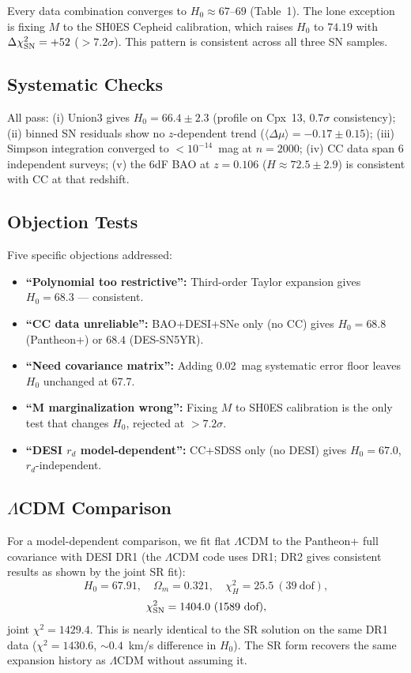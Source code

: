 \documentclass[twocolumn]{aastex631}
\begin{document}
Every data combination converges to $H_0\approx67$--$69$ (Table~1).
The lone exception is fixing $M$ to the SH0ES Cepheid calibration,
which raises $H_0$ to $74.19$ with $\Delta\chi^2_{\rm SN}=+52$
($>7.2\sigma$).  This pattern is consistent across all three SN samples.

\subsection{Systematic Checks}
All pass: (i) Union3 gives $H_0=66.4\pm2.3$ (profile on Cpx~13,
$0.7\sigma$ consistency); (ii) binned SN residuals show no
$z$-dependent trend ($\langle\Delta\mu\rangle=-0.17\pm0.15$);
(iii) Simpson integration converged to $<10^{-14}$~mag at $n=2000$;
(iv) CC data span 6 independent surveys; (v) the 6dF BAO at
$z=0.106$ ($H\approx72.5\pm2.9$) is consistent with CC at that
redshift.

\subsection{Objection Tests}
Five specific objections addressed:
\begin{itemize}
  \item \textbf{``Polynomial too restrictive'':} Third-order Taylor
        expansion gives $H_0=68.3$ --- consistent.
  \item \textbf{``CC data unreliable'':} BAO+DESI+SNe only (no CC)
        gives $H_0=68.8$ (Pantheon+) or $68.4$ (DES-SN5YR).
  \item \textbf{``Need covariance matrix'':} Adding 0.02~mag
        systematic error floor leaves $H_0$ unchanged at 67.7.
  \item \textbf{``M marginalization wrong'':} Fixing $M$ to SH0ES
        calibration is the only test that changes $H_0$, rejected at
        $>7.2\sigma$.
  \item \textbf{``DESI $r_d$ model-dependent'':} CC+SDSS only
        (no DESI) gives $H_0=67.0$, $r_d$-independent.
\end{itemize}

\subsection{$\Lambda$CDM Comparison}
For a model-dependent comparison, we fit flat $\Lambda$CDM to the
Pantheon+ full covariance with DESI DR1 (the $\Lambda$CDM code uses
DR1; DR2 gives consistent results as shown by the joint SR fit):
\[
H_0=67.91,\quad \Omega_m=0.321,\quad
\chi^2_H=25.5\ (39\ \text{dof}),
\]
\[
\chi^2_{\rm SN}=1404.0\ (1589\ \text{dof}),
\]
joint $\chi^2=1429.4$.  This is nearly identical to the SR solution on
the same DR1 data ($\chi^2=1430.6$, $\sim0.4$~km/s difference in
$H_0$).  The SR form recovers the same expansion history as $\Lambda$CDM
without assuming it.
\end{document}
